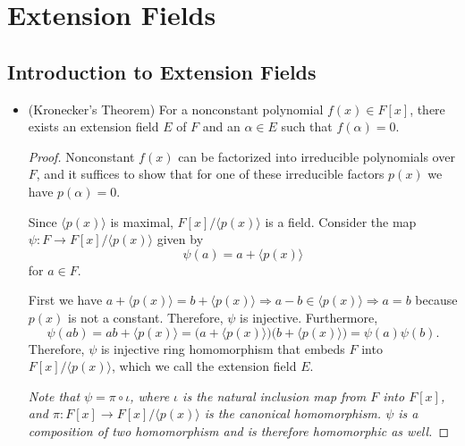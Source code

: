 \documentclass[11pt]{article}
\newcommand{\gen}[1]{\langle #1 \rangle}
\renewcommand{\implies}{\Rightarrow}
\begin{document}
\section{Extension Fields}
\setcounter{subsection}{28}
\subsection{Introduction to Extension Fields}
\begin{itemize}
    \item (Kronecker's Theorem) For a nonconstant polynomial $f(x) \in F[x]$, there exists an extension field $E$ of $F$ and an $\alpha \in E$ such that $f(\alpha) = 0$.
    \begin{proof}
        Nonconstant $f(x)$ can be factorized into irreducible polynomials over $F$, and it suffices to show that for one of these irreducible factors $p(x)$ we have $p(\alpha) = 0$.

        Since $\gen{p(x)}$ is maximal, $F[x]/\gen{p(x)}$ is a field. Consider the map $\psi\colon F \to F[x]/\gen{p(x)}$ given by \[\psi(a) = a + \gen{p(x)}\] for $a \in F$.

        First we have $a + \gen{p(x)} = b + \gen{p(x)} \implies a - b \in \gen{p(x)} \implies a = b$ because $p(x)$ is not a constant. Therefore, $\psi$ is injective. Furthermore, \[\psi(ab) = ab+\gen{p(x)} = \bigl(a+\gen{p(x)}\bigr)\bigl(b+\gen{p(x)}\bigr) = \psi(a)\psi(b).\] Therefore, $\psi$ is injective ring homomorphism that embeds $F$ into $F[x]/\gen{p(x)}$, which we call the extension field $E$.
        
        \emph{Note that $\psi = \pi \circ \iota$, where $\iota$ is the natural inclusion map from $F$ into $F[x]$, and $\pi\colon F[x] \to F[x]/\gen{p(x)}$ is the canonical homomorphism. $\psi$ is a composition of two homomorphism and is therefore homomorphic as well.}


\end{proof}
\end{itemize}
\end{document}
